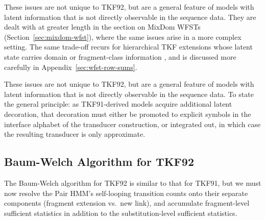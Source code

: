 These issues are not unique to TKF92, but are a general feature of models with latent information that is not directly observable in the sequence data.
They are dealt with at greater length in the section on MixDom WFSTs (Section~\ref{sec:mixdom-wfst}), where the same issues arise in a more complex setting.
\else
The same trade-off recurs for hierarchical TKF extensions whose latent state carries domain or fragment-class information \cite{LargeHolmes2026}, and is discussed more carefully in Appendix~\ref{sec:wfst-row-sums}.

These issues are not unique to TKF92, but are a general feature of models with latent information that is not directly observable in the sequence data.
\fi
To state the general principle: as TKF91-derived models acquire additional latent decoration, that decoration must either be promoted to explicit symbols in the interface alphabet of the transducer construction, or integrated out, in which case the resulting transducer is only approximate.

\subsection{Baum-Welch Algorithm for TKF92}
\label{sec:bw-tkf92}

The Baum-Welch algorithm for TKF92 is similar to that for TKF91, but we must now resolve the Pair HMM's
self-looping transition counts onto their separate components (fragment extension vs.\ new link),
and accumulate fragment-level sufficient statistics in addition to the substitution-level sufficient statistics.

